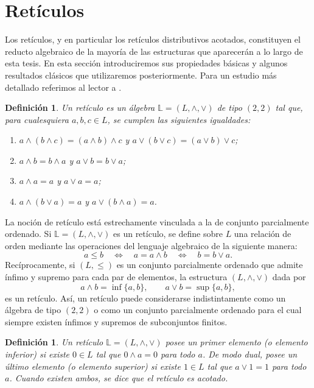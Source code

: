 \documentclass[12pt]{book}
\newtheorem{definition}[theorem]{Definición}
\begin{document}
\section{Retículos}

Los retículos, y en particular los retículos distributivos acotados, constituyen el reducto algebraico de la mayoría de las estructuras que aparecerán a lo largo de esta tesis.  
En esta sección introduciremos sus propiedades básicas y algunos resultados clásicos que utilizaremos posteriormente.  
Para un estudio más detallado referimos al lector a \cite{DP, SS}.

\begin{definition}
Un \emph{retículo} es un álgebra \( \mathbb{L}=(L,\wedge,\vee) \) de tipo \((2,2)\) tal que, para cualesquiera \( a,b,c \in L \), se cumplen las siguientes igualdades:
\begin{enumerate}[\normalfont (1)]
  \item \( a \wedge (b \wedge c) = (a \wedge b) \wedge c \) y \( a \vee (b \vee c) = (a \vee b) \vee c \);
  \item \( a \wedge b = b \wedge a \) y \( a \vee b = b \vee a \);
  \item \( a \wedge a = a \) y \( a \vee a = a \);
  \item \( a \wedge (b \vee a) = a \) y \( a \vee (b \wedge a) = a \).
\end{enumerate}
\end{definition}

La noción de retículo está estrechamente vinculada a la de conjunto parcialmente ordenado.  
Si \( \mathbb{L}=(L,\wedge,\vee) \) es un retículo, se define sobre \( L \) una relación de orden mediante las operaciones del lenguaje algebraico de la siguiente manera:
\[
a \leq b
\quad\Longleftrightarrow\quad
a = a \wedge b
\quad\Longleftrightarrow\quad
b = b \vee a.
\]
Recíprocamente, si \( (L,\leq) \) es un conjunto parcialmente ordenado que admite ínfimo y supremo para cada par de elementos, la estructura \( (L,\wedge,\vee) \) dada por
\[
a\wedge b = \inf\{a,b\}, \qquad a\vee b = \sup\{a,b\},
\]
es un retículo.  
Así, un retículo puede considerarse indistintamente como un álgebra de tipo \((2,2)\) o como un conjunto parcialmente ordenado para el cual siempre existen ínfimos y supremos de subconjuntos finitos.

\begin{definition}
Un retículo \( \mathbb{L}=(L,\wedge,\vee) \) posee un \emph{primer elemento} (o elemento inferior) si existe \( 0 \in L \) tal que \( 0 \wedge a = 0 \) para todo \( a \).  
De modo dual, posee un \emph{último elemento} (o elemento superior) si existe \( 1 \in L \) tal que \( a \vee 1 = 1 \) para todo \( a \).  
Cuando existen ambos, se dice que el retículo es \emph{acotado}.
\end{definition}
\end{document}
